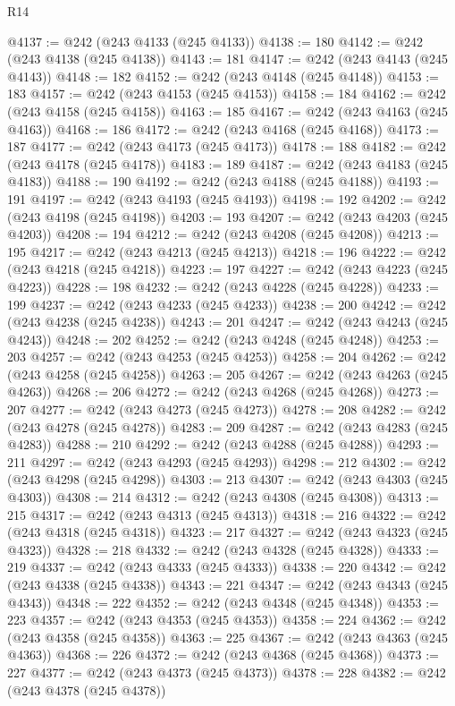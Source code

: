 \begin{lexlean}{R14}
\begin{coremodule}
{{{{{{{{{{{{{{{{{{{{{{{{{{{{{{{{{{{{{{{{{{{{{{{{{{{{{{{{{{{{{{{{{{{{{{{{{{{{{{{{{{@4137 := @242 (@243 @4133 (@245 @4133))
@4138 := 180
@4142 := @242 (@243 @4138 (@245 @4138))
@4143 := 181
@4147 := @242 (@243 @4143 (@245 @4143))
@4148 := 182
@4152 := @242 (@243 @4148 (@245 @4148))
@4153 := 183
@4157 := @242 (@243 @4153 (@245 @4153))
@4158 := 184
@4162 := @242 (@243 @4158 (@245 @4158))
@4163 := 185
@4167 := @242 (@243 @4163 (@245 @4163))
@4168 := 186
@4172 := @242 (@243 @4168 (@245 @4168))
@4173 := 187
@4177 := @242 (@243 @4173 (@245 @4173))
@4178 := 188
@4182 := @242 (@243 @4178 (@245 @4178))
@4183 := 189
@4187 := @242 (@243 @4183 (@245 @4183))
@4188 := 190
@4192 := @242 (@243 @4188 (@245 @4188))
@4193 := 191
@4197 := @242 (@243 @4193 (@245 @4193))
@4198 := 192
@4202 := @242 (@243 @4198 (@245 @4198))
@4203 := 193
@4207 := @242 (@243 @4203 (@245 @4203))
@4208 := 194
@4212 := @242 (@243 @4208 (@245 @4208))
@4213 := 195
@4217 := @242 (@243 @4213 (@245 @4213))
@4218 := 196
@4222 := @242 (@243 @4218 (@245 @4218))
@4223 := 197
@4227 := @242 (@243 @4223 (@245 @4223))
@4228 := 198
@4232 := @242 (@243 @4228 (@245 @4228))
@4233 := 199
@4237 := @242 (@243 @4233 (@245 @4233))
@4238 := 200
@4242 := @242 (@243 @4238 (@245 @4238))
@4243 := 201
@4247 := @242 (@243 @4243 (@245 @4243))
@4248 := 202
@4252 := @242 (@243 @4248 (@245 @4248))
@4253 := 203
@4257 := @242 (@243 @4253 (@245 @4253))
@4258 := 204
@4262 := @242 (@243 @4258 (@245 @4258))
@4263 := 205
@4267 := @242 (@243 @4263 (@245 @4263))
@4268 := 206
@4272 := @242 (@243 @4268 (@245 @4268))
@4273 := 207
@4277 := @242 (@243 @4273 (@245 @4273))
@4278 := 208
@4282 := @242 (@243 @4278 (@245 @4278))
@4283 := 209
@4287 := @242 (@243 @4283 (@245 @4283))
@4288 := 210
@4292 := @242 (@243 @4288 (@245 @4288))
@4293 := 211
@4297 := @242 (@243 @4293 (@245 @4293))
@4298 := 212
@4302 := @242 (@243 @4298 (@245 @4298))
@4303 := 213
@4307 := @242 (@243 @4303 (@245 @4303))
@4308 := 214
@4312 := @242 (@243 @4308 (@245 @4308))
@4313 := 215
@4317 := @242 (@243 @4313 (@245 @4313))
@4318 := 216
@4322 := @242 (@243 @4318 (@245 @4318))
@4323 := 217
@4327 := @242 (@243 @4323 (@245 @4323))
@4328 := 218
@4332 := @242 (@243 @4328 (@245 @4328))
@4333 := 219
@4337 := @242 (@243 @4333 (@245 @4333))
@4338 := 220
@4342 := @242 (@243 @4338 (@245 @4338))
@4343 := 221
@4347 := @242 (@243 @4343 (@245 @4343))
@4348 := 222
@4352 := @242 (@243 @4348 (@245 @4348))
@4353 := 223
@4357 := @242 (@243 @4353 (@245 @4353))
@4358 := 224
@4362 := @242 (@243 @4358 (@245 @4358))
@4363 := 225
@4367 := @242 (@243 @4363 (@245 @4363))
@4368 := 226
@4372 := @242 (@243 @4368 (@245 @4368))
@4373 := 227
@4377 := @242 (@243 @4373 (@245 @4373))
@4378 := 228
@4382 := @242 (@243 @4378 (@245 @4378))
}}}}}}}}}}}}}}}}}}}}}}}}}}}}}}}}}}}}}}}}}}}}}}}}}}}}}}}}}}}}}}}}}}}}}}}}}}}}}}}}}}
\end{coremodule}
\end{lexlean}
